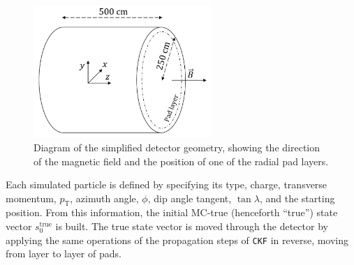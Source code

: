 \begin{figure}[t]
     \centering
         \includegraphics[width=0.6\textwidth]{figures/ch5-KF_NDGAr/Detector_diagram_new.png}
        \caption[Diagram of the simplified detector geometry.]{ Diagram of the simplified detector geometry, showing the direction of the magnetic field and the position of one of the radial pad layers. } \label{fig:DetectorFastSim}
\end{figure}

Each simulated particle is defined by specifying its type, charge, transverse momentum, $p_{\text{T}}$, azimuth angle, $\phi$, dip angle tangent, $\tan\lambda$, and the starting position. From this information, the initial MC-true (henceforth ``true'') state vector $s_0^{\text{true}}$ is built. The true state vector is moved through the detector by applying the same operations of the propagation steps of \texttt{CKF} in reverse, moving from layer to layer of pads.

